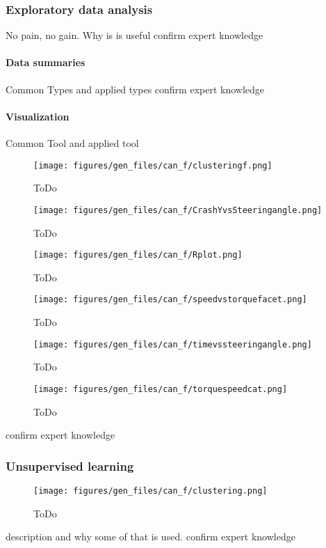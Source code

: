 	\subsubsection{Exploratory data analysis}
		No pain, no gain. Why is is useful
		confirm expert knowledge
		\paragraph{Data summaries}
		Common Types and applied types
		confirm expert knowledge
		\paragraph{Visualization}
		Common Tool and applied tool
		\begin{figure}[!ht]
			\centering
			\texttt{[image: figures/gen\_files/can\_f/clusteringf.png]}
			\caption{ToDo} 
			\end{figure}
		\begin{figure}[!ht]
			\centering
			\texttt{[image: figures/gen\_files/can\_f/CrashYvsSteeringangle.png]}
			\caption{ToDo} 
			\end{figure}
		\begin{figure}[!ht]
			\centering
			\texttt{[image: figures/gen\_files/can\_f/Rplot.png]}
			\caption{ToDo} 
			\end{figure}		
		\begin{figure}[!ht]
			\centering
			\texttt{[image: figures/gen\_files/can\_f/speedvstorquefacet.png]}
			\caption{ToDo} 
			\end{figure}	
		\begin{figure}[!ht]
			\centering
			\texttt{[image: figures/gen\_files/can\_f/timevssteeringangle.png]}
			\caption{ToDo} 
			\end{figure}	
		\begin{figure}[!ht]
			\centering
			\texttt{[image: figures/gen\_files/can\_f/torquespeedcat.png]}
			\caption{ToDo} 
			\end{figure}		
		confirm expert knowledge
	\subsubsection{Unsupervised learning}
			\begin{figure}[!ht]
			\centering
			\texttt{[image: figures/gen\_files/can\_f/clustering.png]}
			\caption{ToDo} 
			\end{figure}
	description and why some of that is used.
	confirm expert knowledge
